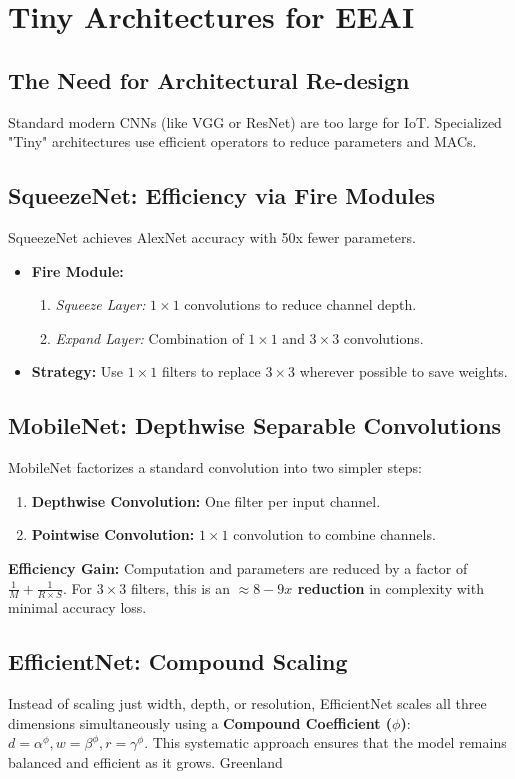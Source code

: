 \section{Tiny Architectures for EEAI}

\subsection{The Need for Architectural Re-design}
Standard modern CNNs (like VGG or ResNet) are too large for IoT. Specialized "Tiny" architectures use efficient operators to reduce parameters and MACs.

\subsection{SqueezeNet: Efficiency via Fire Modules}
SqueezeNet achieves AlexNet accuracy with 50x fewer parameters.
\begin{itemize}
    \item \textbf{Fire Module:}
    \begin{enumerate}
        \item \textit{Squeeze Layer:} $1 \times 1$ convolutions to reduce channel depth.
        \item \textit{Expand Layer:} Combination of $1 \times 1$ and $3 \times 3$ convolutions.
    \end{enumerate}
    \item \textbf{Strategy:} Use $1 \times 1$ filters to replace $3 \times 3$ wherever possible to save weights.
\end{itemize}

\subsection{MobileNet: Depthwise Separable Convolutions}
MobileNet factorizes a standard convolution into two simpler steps:
\begin{enumerate}
    \item \textbf{Depthwise Convolution:} One filter per input channel.
    \item \textbf{Pointwise Convolution:} $1 \times 1$ convolution to combine channels.
\end{enumerate}
\textbf{Efficiency Gain:} Computation and parameters are reduced by a factor of $\frac{1}{M} + \frac{1}{R \times S}$. For $3 \times 3$ filters, this is an \textbf{$\approx 8-9x$ reduction} in complexity with minimal accuracy loss.

\subsection{EfficientNet: Compound Scaling}
Instead of scaling just width, depth, or resolution, EfficientNet scales all three dimensions simultaneously using a \textbf{Compound Coefficient ($\phi$)}:
$d = \alpha^\phi, w = \beta^\phi, r = \gamma^\phi$.
This systematic approach ensures that the model remains balanced and efficient as it grows.
 Greenland
